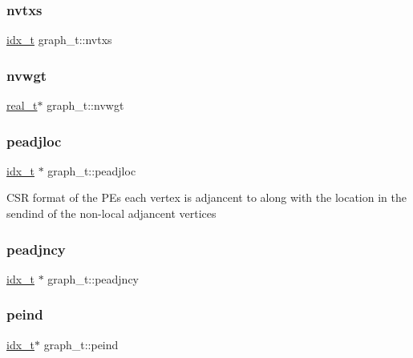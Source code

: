 \subsubsection{\texorpdfstring{nvtxs}{nvtxs}}
{\footnotesize\ttfamily \hyperlink{a00876_aaa5262be3e700770163401acb0150f52}{idx\+\_\+t} graph\+\_\+t\+::nvtxs}

\mbox{\label{a00734_a470310a35290135cb598717b9959734f}} 
\subsubsection{\texorpdfstring{nvwgt}{nvwgt}}
{\footnotesize\ttfamily \hyperlink{a00876_a1924a4f6907cc3833213aba1f07fcbe9}{real\+\_\+t}$\ast$ graph\+\_\+t\+::nvwgt}

\mbox{\label{a00734_a86618ecfba6ab3d5c52b15722ba8075e}} 
\subsubsection{\texorpdfstring{peadjloc}{peadjloc}}
{\footnotesize\ttfamily \hyperlink{a00876_aaa5262be3e700770163401acb0150f52}{idx\+\_\+t} $\ast$ graph\+\_\+t\+::peadjloc}

C\+SR format of the P\+Es each vertex is adjancent to along with the location in the sendind of the non-\/local adjancent vertices \mbox{\label{a00734_aaaddfd8acba59a134963fa72558028fa}} 
\subsubsection{\texorpdfstring{peadjncy}{peadjncy}}
{\footnotesize\ttfamily \hyperlink{a00876_aaa5262be3e700770163401acb0150f52}{idx\+\_\+t} $\ast$ graph\+\_\+t\+::peadjncy}

\mbox{\label{a00734_acf227509e0b67720938e25ae2936c463}} 
\subsubsection{\texorpdfstring{peind}{peind}}
{\footnotesize\ttfamily \hyperlink{a00876_aaa5262be3e700770163401acb0150f52}{idx\+\_\+t}$\ast$ graph\+\_\+t\+::peind}

